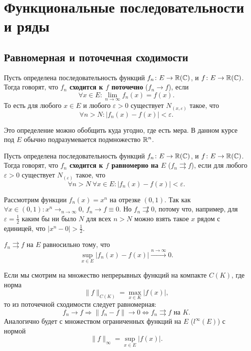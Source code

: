 % 
% 

\chapter{Функциональные последовательности и ряды}
\section{Равномерная и поточечная сходимости}

\begin{defn}
	Пусть определена последовательность функций $ f_n\colon E \to \mathbb{R} (\mathbb{C})$, и $ f\colon E \to \mathbb{R}(\mathbb{C})$. Тогда говорят, что {\bf $ f_n$ сходится к  $ f$ поточечно} ($ f_n \to  f$), если
	\[
		\forall x \in E\colon \lim_{n \to \infty} f_n (x) = f(x)
	.\]
	То есть для любого  $ x \in E$ и любого $ \varepsilon >0$ существует $ N_{(x, \varepsilon )}$ такое, что
	\[
		\forall n > N\colon \lvert f_n(x) - f(x) \rvert < \varepsilon
	.\]
\end{defn}
\begin{note}
	Это определение можно обобщить куда угодно, где есть мера.
	В данном курсе под $ E$ обычно подразумевается подмножество $ \mathbb{R}^{n}$.
\end{note}

\begin{defn}
	Пусть определена последовательность функций $ f_n\colon E \to \mathbb{R} (\mathbb{C})$, и $ f\colon E \to \mathbb{R}(\mathbb{C})$. Тогда говорят, что {\bf $ f_n$ сходится к  $ f$ равномерно на $ E$} ($ f_n \rightrightarrows  f$), если
	для любого $ \varepsilon >0$ существует $ N_{(\varepsilon )}$ такое, что
	\[
		\forall n > N ~ \forall x \in E \colon \lvert f_n(x) - f(x)  \rvert < \varepsilon
	.\]
\end{defn}
\begin{ex}
	Рассмотрим функции $ f_n(x) = x^{n}$ на отрезке $ (0, 1)$. Так как $ \forall x \in  (0, 1)\colon  x^{n} \mathrel{\rightarrow}_{n \to  \infty} 0$, $ f_n \to  f \equiv 0$. Но $ f_n \not\rightrightarrows 0$, потому что, например, для  $ \varepsilon = \frac{1}{2}$ каким бы ни было $ N$ для всех $ n > N$ можно взять такое $ x$ рядом с единицей, что  $ \lvert x^{n}-0 \rvert > \frac{1}{2}$.
\end{ex}

\begin{st}
	$ f_n \rightrightarrows f$ на $ E$ равносильно тому, что
	\[
		\sup_{x \in E} \lvert f_n(x)-f(x) \rvert \stackrel{n \to  \infty} \longrightarrow 0
	.\]
\end{st}
\begin{rem}
	Если мы смотрим на множество непрерывных функций на компакте $ C(K)$, где норма
	\[
		\| f \| _{C(K)} = \max_{x \in  K} \lvert f(x) \rvert
	,\]
	то из поточечной сходимости следует равномерная:
	\[
		f_{n} \to  f \Longrightarrow \| f_n - f \| \to  0 \Longleftrightarrow f_n \rightrightarrows f \text{ на }  K
	.\]
	Аналогично будет с множеством ограниченных функций на $ E$ ($ l^{\infty}(E)$) с нормой
	\[
		\| f \| _{\infty}  = \sup_{x \in E}\lvert f(x) \rvert
	.\]
\end{rem}

